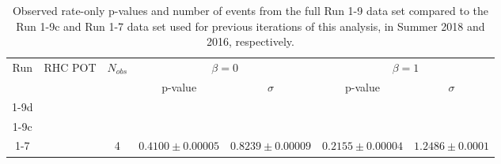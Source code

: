 \begin{table}
	\centering
	\begin{tabular}{|c|c|c|c|c|c|c|}
		\hline
		\multirow{2}{*}{Run} & \multirow{2}{*}{RHC POT}   & \multirow{2}{*}{$N_{obs}$}    & \multicolumn{2}{|c|}{$\beta=0$} & \multicolumn{2}{|c|}{$\beta=1$} \\
		\cline{4-7}     				
		     		         &                            &   				 	          & p-value        & $\sigma$       & p-value      & $\sigma$         \\
		\hline
		
		
		1-9d                 & \TotalPotNuBarRunOneNine   & \NskObservedNueBarRunOneNineD & \pvalRateOnlyBetaZeroDataRunOneNineD & \sigmaRateOnlyBetaZeroDataRunOneNineD & \pvalRateOnlyBetaOneDataRunOneNineD  & \sigmaRateOnlyBetaOneDataRunOneNineD \\
		\hline
		
		
		1-9c                 & \TotalPotNuBarRunOneNineC  & \NskObservedNueBarRunOneNineC & \pvalRateOnlyBetaZeroData & \sigmaRateOnlyBetaZeroData & \pvalRateOnlyBetaOneData & \sigmaRateOnlyBetaOneData \\
		\hline
		
		
		1-7                  & \TotalPotNuBarRunOneSevenC & 4			  				  & $0.4100 \pm 0.00005$  & $0.8239 \pm 0.00009$			& $0.2155 \pm 0.00004$       & $1.2486 \pm 0.0001$ \\
		\hline
	\end{tabular}
	\caption{Observed rate-only p-values and number of events from the full Run 1-9 data set compared to the Run 1-9c and Run 1-7 data set used for previous iterations of this analysis, in Summer 2018 and 2016\cite{OurRun16AntiNueBarAppearanceAnalysis3Flavour}, respectively.}
	\label{tab:data_comparison_rate_R19d_R17}
\end{table}


